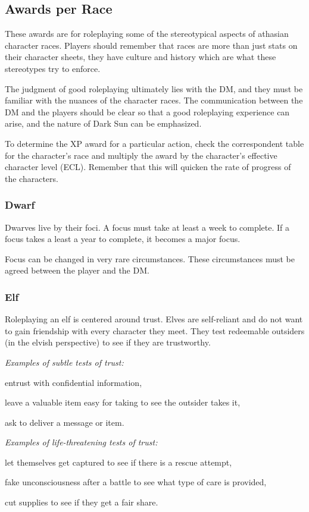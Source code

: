 \subsection{Awards per Race}
These awards are for roleplaying some of the stereotypical aspects of athasian character races. Players should remember that races are more than just stats on their character sheets, they have culture and history which are what these stereotypes try to enforce.

The judgment of good roleplaying ultimately lies with the DM, and they must be familiar with the nuances of the character races. The communication between the DM and the players should be clear so that a good roleplaying experience can arise, and the nature of {\tableheader Dark Sun} can be emphasized.

To determine the XP award for a particular action, check the correspondent table for the character's race and multiply the award by the character's effective character level (ECL). Remember that this will quicken the rate of progress of the characters.

\subsubsection{Dwarf}
Dwarves live by their foci. A focus must take at least a week to complete. If a focus takes a least a year to complete, it becomes a major focus.

Focus can be changed in very rare circumstances. These circumstances must be agreed between the player and the DM.

\subsubsection{Elf}
Roleplaying an elf is centered around trust. Elves are self-reliant and do not want to gain friendship with every character they meet. They test redeemable outsiders (in the elvish perspective) to see if they are trustworthy.

\textit{Examples of subtle tests of trust:}
\begin{itemize*}
	\item entrust with confidential information,
	\item leave a valuable item easy for taking to see the outsider takes it,
	\item ask to deliver a message or item.
\end{itemize*}

\textit{Examples of life-threatening tests of trust:}
\begin{itemize*}
	\item let themselves get captured to see if there is a rescue attempt,
	\item fake unconsciousness after a battle to see what type of care is provided,
	\item cut supplies to see if they get a fair share.
\end{itemize*}

